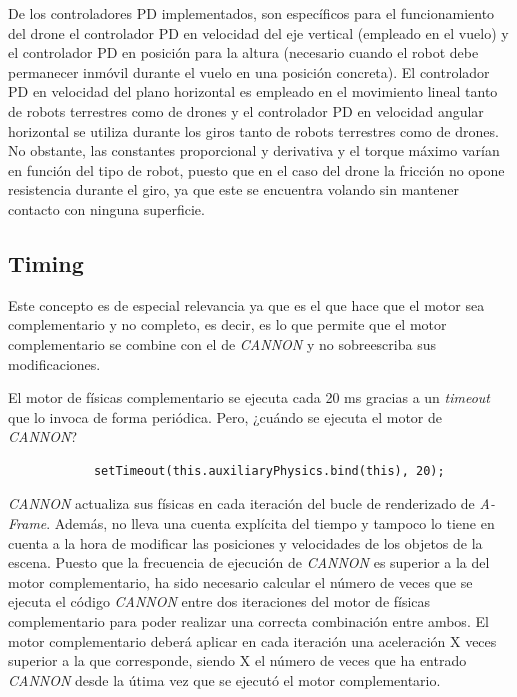 De los controladores PD implementados, son específicos para el funcionamiento del drone el controlador PD en velocidad del eje vertical (empleado en el vuelo) y el controlador PD en posición para la altura (necesario cuando el robot debe permanecer inmóvil durante el vuelo en una posición concreta). El controlador PD en velocidad del plano horizontal es empleado en el movimiento lineal tanto de robots terrestres como de drones y el controlador PD en velocidad angular horizontal se utiliza durante los giros tanto de robots terrestres como de drones. No obstante, las constantes proporcional y derivativa y el torque máximo varían en función del tipo de robot, puesto que en el caso del drone la fricción no opone resistencia durante el giro, ya que este se encuentra volando sin mantener contacto con ninguna superficie.
    
\normalsize
\subsection{Timing}
Este concepto es de especial relevancia ya que es el que hace que el motor sea complementario y no completo, es decir, es lo que permite que el motor complementario se combine con el de \textit{CANNON} y no sobreescriba sus modificaciones. \newline

El motor de físicas complementario se ejecuta cada 20 ms gracias a un \textit{timeout} que lo invoca de forma periódica. Pero, ¿cuándo se ejecuta el motor de \textit{CANNON}? 

\small {
\begin{verbatim}
            setTimeout(this.auxiliaryPhysics.bind(this), 20);
\end{verbatim}
}

\normalsize
\textit{CANNON} actualiza sus físicas en cada iteración del bucle de renderizado de \textit{A-Frame}. Además, no lleva una cuenta explícita del tiempo y tampoco lo tiene en cuenta a la hora de modificar las posiciones y velocidades de los objetos de la escena. Puesto que la frecuencia de ejecución de \textit{CANNON} es superior a la del motor complementario, ha sido necesario calcular el número de veces que se ejecuta el código \textit{CANNON} entre dos iteraciones del motor de físicas complementario para poder realizar una correcta combinación entre ambos. El motor complementario deberá aplicar en cada iteración una aceleración X veces superior a la que corresponde, siendo X el número de veces que ha entrado \textit{CANNON} desde la útima vez que se ejecutó el motor complementario. \newline

